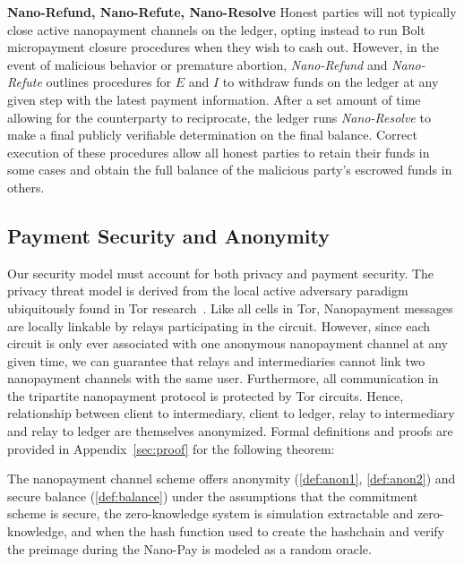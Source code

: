 \textbf{Nano-Refund, Nano-Refute, Nano-Resolve} Honest parties will not
typically close active nanopayment channels on the ledger, opting instead to run
Bolt micropayment closure procedures when they wish to cash out. However, in the
event of malicious behavior or premature abortion, \emph{Nano-Refund} and
\emph{Nano-Refute} outlines procedures for $E$ and $I$ to withdraw funds on the
ledger at any given step with the latest payment information. After a set amount
of time allowing for the counterparty to reciprocate, the ledger runs
\emph{Nano-Resolve} to make a final publicly verifiable determination on the
final balance. Correct execution of these procedures allow all honest parties to
retain their funds in some cases and obtain the full balance of the malicious
party's escrowed funds in others.

\subsection{Payment Security and Anonymity}
\label{subsec:paysecurity}
Our security model must account for both privacy and payment security. The
privacy threat model is derived from the local active adversary paradigm
ubiquitously found in Tor research~\cite{dingledine2004tor}. Like all cells in
Tor, Nanopayment messages are locally linkable by relays participating in the
circuit. However, since each circuit is only ever associated with one anonymous
nanopayment channel at any given time, we can guarantee that relays and
intermediaries cannot link two nanopayment channels with the same user.
Furthermore, all communication in the tripartite nanopayment protocol is
protected by Tor circuits. Hence, relationship between client to intermediary,
client to ledger, relay to intermediary and relay to ledger are themselves
anonymized. Formal definitions and proofs are provided in
Appendix~\ref{sec:proof} for the following theorem:

\begin{theorem}
  The nanopayment channel scheme offers anonymity (\ref{def:anon1},
  \ref{def:anon2}) and secure balance (\ref{def:balance}) under the assumptions
  that the commitment scheme is secure, the zero-knowledge system is simulation
  extractable and zero-knowledge, and when the hash function used to create the
  hashchain and verify the preimage during the Nano-Pay is modeled as a random
  oracle.



\end{theorem}

